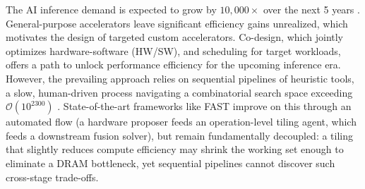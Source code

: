 The AI inference demand is expected to grow by $10,000\times$ over the next 5 years \citep{cra2026aifuture}. General-purpose accelerators leave significant efficiency gains unrealized, which motivates the design of targeted custom accelerators. Co-design, which jointly optimizes hardware-software (HW/SW), and scheduling for target workloads, offers a path to unlock performance efficiency for the upcoming inference era. However, the prevailing approach relies on sequential pipelines of heuristic tools, a slow, human-driven process navigating a combinatorial search space exceeding $\mathcal O(10^{2300})$ \citep{zhang_fast}. State-of-the-art frameworks like FAST \citep{zhang_fast} improve on this through an automated flow (a hardware proposer feeds an operation-level tiling agent, which feeds a downstream fusion solver), but remain fundamentally decoupled: a tiling that slightly reduces compute efficiency may shrink the working set enough to eliminate a DRAM bottleneck, yet sequential pipelines cannot discover such cross-stage trade-offs.

